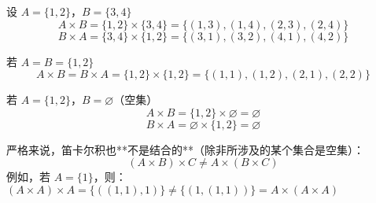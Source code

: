 设 \( A = \{1, 2\} \)，\( B = \{3, 4\} \)  
  \[
  A \times B = \{1, 2\} \times \{3, 4\} = \{(1,3), (1,4), (2,3), (2,4)\}~  
  \]  
  \[
  B \times A = \{3, 4\} \times \{1, 2\} = \{(3,1), (3,2), (4,1), (4,2)\}~  
  \]

若 \( A = B = \{1, 2\} \)  
  \[
  A \times B = B \times A = \{1, 2\} \times \{1, 2\} = \{(1,1), (1,2), (2,1), (2,2)\}~  
  \]

若 \( A = \{1, 2\} \)，\( B = \varnothing \)（空集）  
  \[
  A \times B = \{1, 2\} \times \varnothing = \varnothing ~
  \]  
  \[
  B \times A = \varnothing \times \{1, 2\} = \varnothing ~ 
  \]

严格来说，笛卡尔积也**不是结合的**（除非所涉及的某个集合是空集）：
\[
(A \times B) \times C \ne A \times (B \times C)~
\]
例如，若 \( A = \{1\} \)，则：\((A \times A) \times A = \{((1,1),1)\} \ne \{(1,(1,1))\} = A \times (A \times A)\)